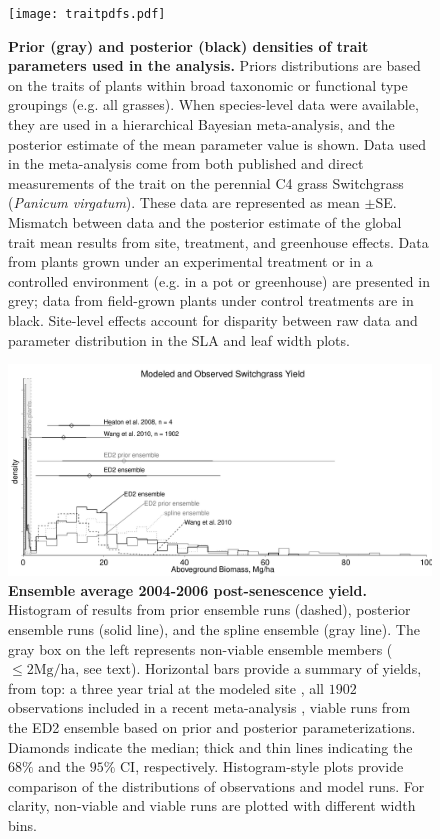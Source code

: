 \documentclass[12pt]{article}
\begin{document}
\begin{flushleft}
\begin{spacing}{1.9}
\begin{figure}[p]
  \caption%
{{\bf Prior (gray) and posterior (black) densities of trait parameters used in the analysis.} 
    Priors distributions are based on the traits of plants within broad taxonomic or functional type groupings (e.g. all grasses). 
    When species-level data were available, they are used in a hierarchical Bayesian meta-analysis, and the posterior estimate of the mean parameter value is shown. 
    Data used in the meta-analysis come from both published and direct measurements of the trait on the perennial C4 grass Switchgrass (\emph{Panicum virgatum}).
    These data are represented as mean $\pm$SE.
    Mismatch between data and the posterior estimate of the global trait mean results from site, treatment, and greenhouse effects. 
    Data from plants grown under an experimental treatment or in a controlled environment (e.g. in a pot or greenhouse) are presented in grey; data from field-grown plants under control treatments are in black. 
Site-level effects account for disparity between raw data and parameter distribution in the SLA and leaf width plots.
}
\begin{center}
  \texttt{[image: traitpdfs.pdf]}
\end{center}
  \label{fig:traitpdfs}
\end{figure}


\begin{figure}[p]
\caption%
{{\bf Ensemble average 2004-2006  post-senescence yield.} 
  Histogram of results from prior ensemble runs (dashed), posterior ensemble runs (solid line), and the spline ensemble (gray line).  
  The gray box on the left represents non-viable ensemble members ($\leq 2\text{Mg/ha}$, see text).
  Horizontal bars provide a summary of yields, from top: a three year trial at the modeled site \citep{heaton2008mub},  all $1902$ observations included in a recent meta-analysis \citep{wang2010qrc}, viable runs from the ED2 ensemble based on prior and posterior parameterizations.
  Diamonds indicate the median; thick and thin lines indicating the $68\%$ and the $95\%$ CI, respectively.
  Histogram-style plots provide comparison of the distributions of observations and model runs.
  For clarity, non-viable and viable runs are plotted with different width bins.
} 
\begin{center}
\includegraphics[width=\textwidth]{ensembledensity.pdf}
\end{center}
\label{fig:ensembledensity}
\end{figure}


\end{spacing}
\end{flushleft}
\end{document}
